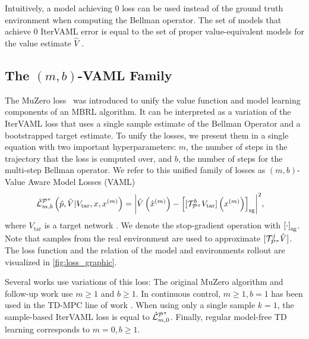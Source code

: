 Intuitively, a model achieving $0$ loss can be used instead of the ground truth environment when computing the Bellman operator.
The set of models that achieve $0$ IterVAML error is equal to the set of proper value-equivalent models for the value estimate $\hat{V}$ \cite{grimm2021proper}.

\subsection{The $(m,b)$-VAML Family}
The MuZero loss~\parencite{schrittwieser2020mastering} was introduced to unify the value function and model learning components of an MBRL algorithm.
It can be interpreted as a variation of the IterVAML loss that uses a single sample estimate of the Bellman Operator and a bootstrapped target estimate. 
To unify the losses, we present them in a single equation with two important hyperparameters: $m$, the number of steps in the trajectory that the loss is computed over, and $b$, the number of steps for the multi-step Bellman operator.
We refer to this unified family of losses as $(m,b)$-Value Aware Model Losses (VAML)
\begin{align}
    & \hat{\mathcal{L}}^{\P^\pi}_{m,b}\left(\hat{p},\hat{V}|V_\mathrm{tar},x, x^{(m)}\right) = \biggl|\hat{V}\roundb{\hat{x}^{(m)}} - 
    \squareb{[\mathcal{T}_{\P^\pi}^b V_\mathrm{tar}]\roundb{x^{(m)}}}_\mathrm{sg}\biggr|^2, \label{eq:dal_loss}
\end{align}
%
where $V_\mathrm{tar}$ is a target network \parencite{mnih2013playing}.
We denote the stop-gradient operation with $\squareb{\cdot}_\mathrm{sg}$.
Note that samples from the real environment are used to approximate $[\mathcal{T}_{\P^\pi}^j \hat{V}]$.
The loss function and the relation of the model and environments rollout are visualized in \autoref{fig:loss_graphic}.

Several works use variations of this loss:
The original MuZero algorithm \parencite{schrittwieser2020mastering} and follow-up work \parencite{ye2021mastering,antonoglou2022planning} use $m\geq1$ and $b\geq1$.
In continuous control, $m\geq1,b=1$ has been used in the TD-MPC line of work \parencite{hansen2022temporal,hansen2024tdmpc}.
When using only a single sample $k=1$, the sample-based IterVAML loss is equal to $\hat{\mathcal{L}}^{\P^\pi}_{m,0}$.
Finally, regular model-free TD learning corresponds to $m=0,b\geq1$.


